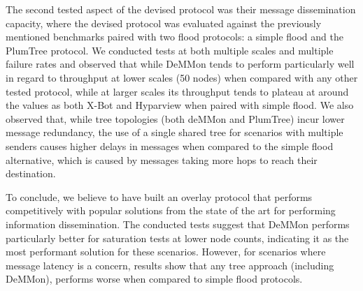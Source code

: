 The second tested aspect of the devised protocol was their message dissemination capacity, where the devised protocol was evaluated against the previously mentioned benchmarks paired with two flood protocols: a simple flood and the PlumTree protocol. We conducted tests at both multiple scales and multiple failure rates and observed that while DeMMon tends to perform particularly well in regard to throughput at lower scales (50 nodes) when compared with any other tested protocol, while at larger scales its throughput tends to plateau at around the values as both X-Bot and Hyparview when paired with simple flood. We also observed that, while tree topologies (both deMMon and PlumTree) incur lower message redundancy, the use of a single shared tree for scenarios with multiple senders causes higher delays in messages when compared to the simple flood alternative, which is caused by messages taking more hops to reach their destination.

To conclude, we believe to have built an overlay protocol that performs competitively with popular solutions from the state of the art for performing information dissemination. The conducted tests suggest that DeMMon performs particularly better for saturation tests at lower node counts, indicating it as the most performant solution for these scenarios. However, for scenarios where message latency is a concern, results show that any tree approach (including DeMMon), performs worse when compared to simple flood protocols.



